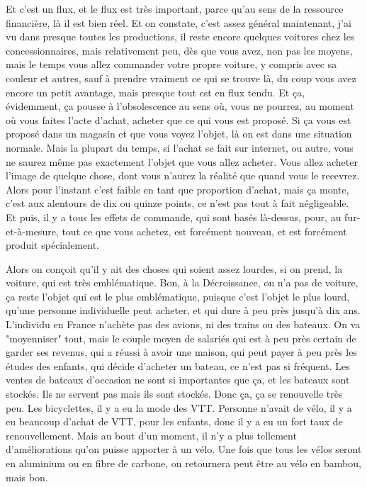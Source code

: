 \begin{description}
Et c'est un flux, et le flux est très important, parce qu’au sens de la ressource financière, là il est bien réel. Et on constate, c'est assez général maintenant, j'ai vu dans presque toutes les productions, il reste encore quelques voitures chez les concessionnaires, mais relativement peu, dès que vous avez, non pas les moyens, mais le temps vous allez commander votre propre voiture, y compris avec sa couleur et autres, sauf à prendre vraiment ce qui se trouve là, du coup vous avez encore un petit avantage, mais presque tout est en flux tendu. Et ça, évidemment, ça pousse à l'obsolescence au sens où, vous ne pourrez, au moment où vous faites l'acte d'achat, acheter que ce qui vous est proposé. Si ça vous est proposé dans un magasin et que vous voyez l'objet, là on est dans une situation normale. Mais la plupart du temps, si l'achat se fait sur internet, ou autre, vous ne saurez même pas exactement l'objet que vous allez acheter. Vous allez acheter l'image de quelque chose, dont vous n'aurez la réalité que quand vous le recevrez. Alors pour l'instant c'est faible en tant que proportion d'achat, mais ça monte, c'est aux alentours de dix ou quinze points, ce n'est pas tout à fait négligeable. Et puis, il y a tous les effets de commande, qui sont basés là-dessus, pour, au fur-et-à-mesure, tout ce que vous achetez, est forcément nouveau, et est forcément produit spécialement. 

Alors on conçoit qu'il y ait des choses qui soient assez lourdes, si on prend, la voiture, qui est très emblématique. Bon, à la Décroissance, on n'a pas de voiture, ça reste l'objet qui est le plus emblématique, puisque c'est l'objet le plus lourd, qu'une personne individuelle peut acheter, et qui dure à peu près jusqu'à dix ans. L'individu en France n'achète pas des avions, ni des trains ou des bateaux. On va "moyenniser" tout, mais le couple moyen de salariés qui est à peu près certain de garder ses revenus, qui a réussi à avoir une maison, qui peut payer à peu près les études des enfants, qui décide d'acheter un bateau, ce n’est pas si fréquent. Les ventes de bateaux d'occasion ne sont si importantes que ça, et les bateaux sont stockés. Ils ne servent pas mais ils sont stockés. Donc ça, ça se renouvelle très peu. Les bicyclettes, il y a eu la mode des VTT. Personne n'avait de vélo, il y a eu beaucoup d'achat de VTT, pour les enfants, donc il y a eu un fort taux de renouvellement. Mais au bout d'un moment, il n'y a plus tellement d'améliorations qu'on puisse apporter à un vélo. Une fois que tous les vélos seront en aluminium ou en fibre de carbone, on retournera peut être au vélo en bambou, mais bon. 


\end{description}

